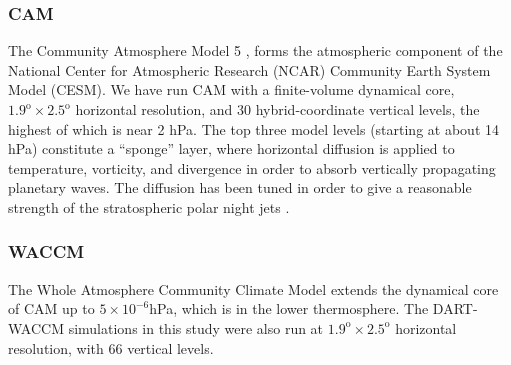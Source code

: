 \subsubsection{CAM}
The Community Atmosphere Model 5 \citep[CAM5]{nealeetal2010}, forms the atmospheric component of the National Center for Atmospheric Research (NCAR) Community Earth System Model (CESM). 
We have run CAM with a finite-volume dynamical core, $1.9^{\text{o}} \times 2.5^{\text{o}}$ horizontal resolution, and  30 hybrid-coordinate vertical levels, the highest of which is near 2 hPa.
The top three model levels (starting at about 14 hPa) constitute a ``sponge'' layer, where horizontal diffusion is applied to temperature, vorticity, and divergence in order to absorb vertically propagating planetary waves.  
The diffusion has been tuned in order to give a reasonable strength of the stratospheric polar night jets \citep{nealeetal2010}.

\subsubsection{WACCM}
The Whole Atmosphere Community Climate Model \citep[WACCM]{Marsh2013} extends the dynamical core of CAM up to $5 \times 10^{-6}$hPa, which is in the lower thermosphere. 
The DART-WACCM simulations in this study were also run at $1.9^{\text{o}} \times 2.5^{\text{o}}$ horizontal resolution, with 66 vertical levels. 

